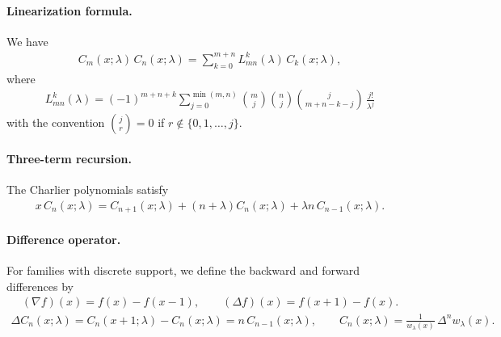 \documentclass[a4paper,11pt]{article}
\numberwithin{equation}{section}
\theoremstyle{plain}
\theoremstyle{definition}
\theoremstyle{remark}
\newcommand{\1}{\ensuremath{\mathds{1}}\xspace}
\begin{document}
\paragraph{Linearization formula.}
We have
\begin{align}
C_m(x;\lambda)\,C_n(x;\lambda)
=\sum_{k=0}^{m+n} L_{mn}^k(\lambda)\,C_k(x;\lambda),
\end{align}
where 
\begin{align}
L_{mn}^k(\lambda)
= (-1)^{m+n+k}\sum_{j=0}^{\min(m,n)}
\binom{m}{j}\binom{n}{j}\binom{j}{m+n-k-j}\,\frac{j!}{\lambda^{j}}
\end{align}
with the convention $\binom{j}{r}=0$ if $r\notin\{0,1,\dots,j\}$.
\paragraph{Three-term recursion.}
The Charlier polynomials satisfy
\begin{align}
    x\,C_n(x;\lambda)
    = C_{n+1}(x;\lambda)
    + (n+\lambda)C_n(x;\lambda)
    + \lambda n\, C_{n-1}(x;\lambda).
\end{align}

\paragraph{Difference operator.}
For families with discrete support, we define the backward and forward differences by
\begin{align}
(\nabla f)(x)=f(x)-f(x-1),
\qquad
(\Delta f)(x)=f(x+1)-f(x).
\end{align}
\begin{align}
\Delta C_n(x;\lambda)=C_n(x+1;\lambda)-C_n(x;\lambda)=n\,C_{n-1}(x;\lambda),
\qquad
C_n(x;\lambda)=\frac{1}{w_\lambda(x)}\,\Delta^n w_\lambda(x).
\end{align}
\end{document}
